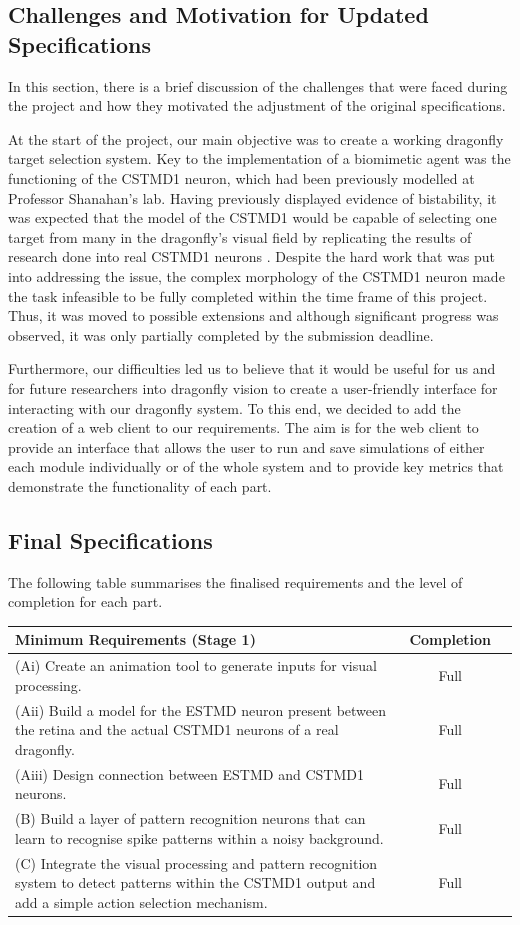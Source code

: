 \documentclass[a4paper,11pt]{article}
\begin{document}
\subsection{Challenges and Motivation for Updated Specifications}
In this section, there is a brief discussion of the challenges that were faced during the project and how they motivated the adjustment of the original specifications.\par
	At the start of the project, our main objective was to create a working dragonfly target selection system. Key to the implementation of a biomimetic agent was the functioning of the CSTMD1 neuron, which had been previously modelled at Professor Shanahan's lab. Having previously displayed evidence of bistability, it was expected that the model of the CSTMD1 would be capable of selecting one target from many in the dragonfly's visual field by replicating the results of research done into real CSTMD1 neurons \cite{w13}. Despite the hard work that was put into addressing the issue, the complex morphology of the CSTMD1 neuron made the task infeasible to be fully completed within the time frame of this project. Thus, it was moved to possible extensions and although significant progress was observed, it was only partially completed by the submission deadline.\par
	Furthermore, our difficulties led us to believe that it would be useful for us and for future researchers into dragonfly vision to create a user-friendly interface for interacting with our dragonfly system. To this end, we decided to add the creation of a web client to our requirements. The aim is for the web client to provide an interface that allows the user to run and save simulations of either each module individually or of the whole system and to provide key metrics that demonstrate the functionality of each part.
	
\subsection{Final Specifications}
The following table summarises the finalised requirements and the level of completion for each part.
\begin{center}
    \begin{tabular}{p{12cm} c c}
    \textbf{Minimum Requirements (Stage 1)} & \textbf{Completion} \\ \hline
    (Ai) Create an animation tool to generate inputs for visual processing. & Full \\ 
	(Aii) Build a model for the ESTMD neuron present between the retina and the actual CSTMD1 neurons of a real dragonfly. & Full \\
	(Aiii) Design connection between ESTMD and CSTMD1 neurons. & Full \\
	(B) Build a layer of pattern recognition neurons that can learn to recognise spike patterns within a noisy background. & Full\\
	(C) Integrate the visual processing and pattern recognition system to detect patterns within the CSTMD1 output and add a simple action selection mechanism. & Full\\
    \end{tabular}
\end{center}
\end{document}
